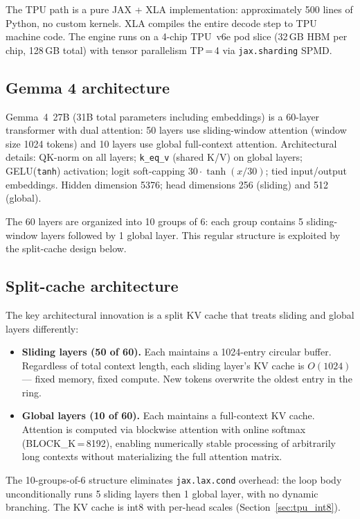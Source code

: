 The TPU path is a pure JAX + XLA implementation: approximately 500 lines
of Python, no custom kernels. XLA compiles the entire decode step to TPU
machine code. The engine runs on a 4-chip TPU~v6e pod slice (32\,GB HBM
per chip, 128\,GB total) with tensor parallelism TP\,=\,4 via
\texttt{jax.sharding} SPMD.

\subsection{Gemma 4 architecture}

Gemma~4~27B (31B total parameters including embeddings) is a 60-layer
transformer with dual attention: 50 layers use sliding-window attention
(window size 1024 tokens) and 10 layers use global full-context
attention. Architectural details: QK-norm on all layers;
\texttt{k\_eq\_v} (shared K/V) on global layers; GELU(\texttt{tanh})
activation; logit soft-capping $30 \cdot \tanh(x/30)$; tied input/output
embeddings. Hidden dimension 5376; head dimensions 256 (sliding) and
512 (global).

The 60 layers are organized into 10 groups of 6: each group contains
5 sliding-window layers followed by 1 global layer. This regular
structure is exploited by the split-cache design below.

\subsection{Split-cache architecture}

The key architectural innovation is a split KV cache that treats
sliding and global layers differently:

\begin{itemize}
\item \textbf{Sliding layers (50 of 60).} Each maintains a 1024-entry
  circular buffer. Regardless of total context length, each sliding
  layer's KV cache is $O(1024)$ --- fixed memory, fixed compute. New
  tokens overwrite the oldest entry in the ring.

\item \textbf{Global layers (10 of 60).} Each maintains a full-context
  KV cache. Attention is computed via blockwise attention with online
  softmax (BLOCK\_K\,=\,8192), enabling numerically stable processing of
  arbitrarily long contexts without materializing the full attention
  matrix.
\end{itemize}

The 10-groups-of-6 structure eliminates \texttt{jax.lax.cond} overhead:
the loop body unconditionally runs 5 sliding layers then 1 global layer,
with no dynamic branching. The KV cache is int8 with per-head scales
(Section~\ref{sec:tpu_int8}).

